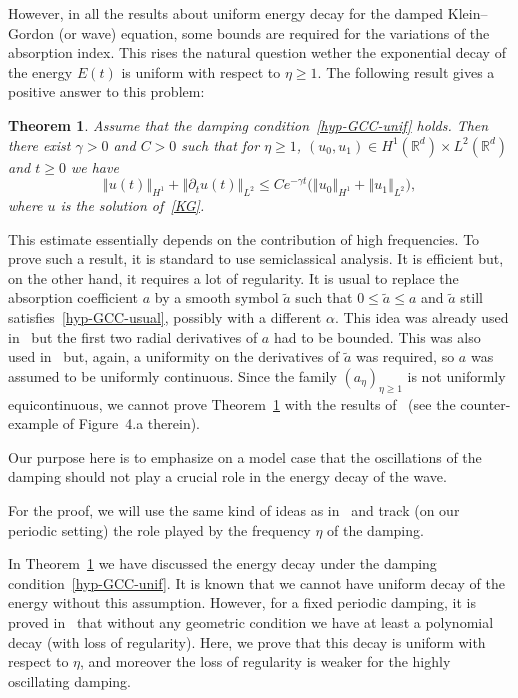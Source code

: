 \documentclass[11pt]{article}
\newtheorem{theo}{Theorem}[section]
\theoremstyle{definition}
\numberwithin{equation}{section}
\numberwithin{figure}{section}
\numberwithin{table}{section}
\newcommand{\nr}[1]{\left\Vert #1\right\Vert}
\renewcommand{\leq}{\leqslant}
\renewcommand{\geq}{\geqslant}
\newcommand{\1}{\mathds 1}
\newcommand{\R}{\mathbb{R}}
\renewcommand{\a}{\alpha}
\newcommand{\g}{\gamma}
\begin{document}
However, in all the results about uniform energy decay for the damped Klein--Gordon (or wave) equation, some bounds are required for the variations of the absorption index. This rises the natural question wether the exponential decay of the energy $E(t)$ is uniform with respect to $\eta \geq 1$. The following result gives a positive answer to this problem:

\begin{theo}\label{th-unif-decay}
Assume that the damping condition~\eqref{hyp-GCC-unif} holds. Then there exist $\g > 0$ and $C > 0$ such that for $\eta \geq 1$, $(u_0,u_1) \in H^1(\R^d) \times L^2(\R^d)$ and $t \geq 0$ we have
\[
\nr{u(t)}_{H^1} + \nr{\partial_t u(t)}_{L^2} \leq C e^{-\g t} \big(\nr{u_0}_{H^1} + \nr{u_1}_{L^2} \big),
\]
where $u$ is the solution of~\eqref{KG}.
\end{theo}

This estimate essentially depends on the contribution of high frequencies. To prove such a result, it is standard to use semiclassical analysis. It is efficient but, on the other hand, it requires a lot of regularity. It is usual to replace the absorption coefficient $a$ by a smooth symbol $\tilde a$ such that $0 \leq \tilde a \leq a$ and $\tilde a$ still satisfies~\eqref{hyp-GCC-usual}, possibly with a different $\a$. This idea was already used in~\cite{royer-mourre} but the first two radial derivatives of $a$ had to be bounded. This was also used in~\cite{BurqJo} but, again, a uniformity on the derivatives of $\tilde a$ was required, so $a$ was assumed to be uniformly continuous. Since the family $(a_\eta)_{\eta \geq 1}$ is not uniformly equicontinuous, we cannot prove Theorem~\ref{th-unif-decay} with the results of~\cite{BurqJo} (see the counter-example of Figure~4.a therein).

Our purpose here is to emphasize on a model case that the oscillations of the damping should not play a crucial role in the energy decay of the wave.

For the proof, we will use the same kind of ideas as in~\cite{BurqJo} and track (on our periodic setting) the role played by the frequency $\eta$ of the damping.%


In Theorem~\ref{th-unif-decay} we have discussed the energy decay under the damping condition~\eqref{hyp-GCC-unif}. It is known that we cannot have uniform decay of the energy without this assumption. However, for a fixed periodic damping, it is proved in~\cite{Wunsch} that without any geometric condition we have at least a polynomial decay (with loss of regularity). Here, we prove that this decay is uniform with respect to $\eta$, and moreover the loss of regularity is weaker for the highly oscillating damping.
\end{document}
